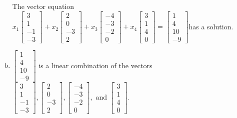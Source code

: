 \begin{exerciseAnswer}
\begin{enumerate}[(a)]
\begin{center}
\begin{minipage}{0.8\textwidth}
 The vector equation \( x_{1} \left[\begin{array}{c}
3 \\
1 \\
-1 \\
-3
\end{array}\right] + x_{2} \left[\begin{array}{c}
2 \\
0 \\
-3 \\
2
\end{array}\right] + x_{3} \left[\begin{array}{c}
-4 \\
-3 \\
-2 \\
0
\end{array}\right] + x_{4} \left[\begin{array}{c}
3 \\
1 \\
4 \\
0
\end{array}\right] = \left[\begin{array}{c}
1 \\
4 \\
10 \\
-9
\end{array}\right] \)has a solution.
\end{minipage}\end{center}
    
\item 

\( \left[\begin{array}{c}
1 \\
4 \\
10 \\
-9
\end{array}\right] \) is a linear combination of the vectors \( \left[\begin{array}{c}
3 \\
1 \\
-1 \\
-3
\end{array}\right] , \left[\begin{array}{c}
2 \\
0 \\
-3 \\
2
\end{array}\right] , \left[\begin{array}{c}
-4 \\
-3 \\
-2 \\
0
\end{array}\right] , \text{ and } \left[\begin{array}{c}
3 \\
1 \\
4 \\
0
\end{array}\right] \). 


\end{enumerate}
    
\end{exerciseAnswer}
    
